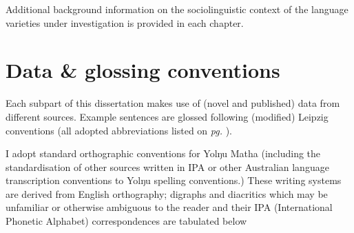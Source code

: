 \documentclass[12pt,dvipsnames]{report}
\begin{document}
Additional background information on the sociolinguistic context of the language varieties under investigation is provided in each chapter.


\section{Data \& glossing conventions}

Each subpart of this dissertation makes use of (novel and published) data from different sources. Example sentences are glossed following (modified) Leipzig conventions (all adopted abbreviations listed on \textit{pg.} \pageref{glossing}).

 I adopt standard orthographic conventions for Yolŋu Matha (including the standardisation of other sources written in IPA or other Australian language transcription conventions to Yolŋu spelling conventions.) These writing systems are derived from English orthography; digraphs and diacritics which may be unfamiliar or otherwise ambiguous to the reader and their IPA (International Phonetic Alphabet) correspondences are tabulated below \citetext{Table \ref{tab:orthogr}. See also, \textit{e.g.}, \citealt[549]{Dixon2002a} for an overview of ``canonical'' phoneme inventories in Australian Language and \citealp{Wilkinson1991} for the Yolŋu orthography (\textit{pp.} 41--4), due to Beulah Lowe and a general discussion of the Djambarrpuyŋu phoneme inventory.}
\end{document}
